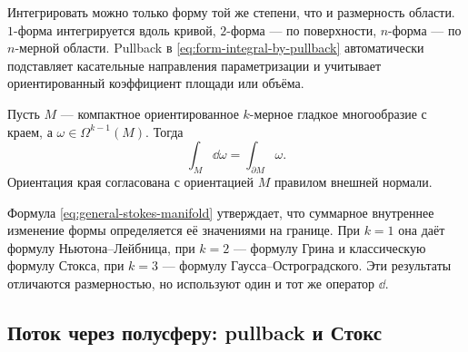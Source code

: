 Интегрировать можно только форму той же степени, что и размерность области. \(1\)-форма интегрируется вдоль кривой, \(2\)-форма --- по поверхности, \(n\)-форма --- по \(n\)-мерной области. Pullback в \eqref{eq:form-integral-by-pullback} автоматически подставляет касательные направления параметризации и учитывает ориентированный коэффициент площади или объёма.

\begin{theorem}
\label{thm:general-stokes-manifold}
Пусть \(M\) --- компактное ориентированное \(k\)-мерное гладкое многообразие с краем, а \(\omega\in\Omega^{k-1}(M)\). Тогда
\begin{equation}
\label{eq:general-stokes-manifold}
\boxed{
\int_M\dd\omega
=
\int_{\partial M}\omega
}.
\end{equation}
Ориентация края согласована с ориентацией \(M\) правилом внешней нормали.
\end{theorem}

Формула \eqref{eq:general-stokes-manifold} утверждает, что суммарное внутреннее изменение формы определяется её значениями на границе. При \(k=1\) она даёт формулу Ньютона--Лейбница, при \(k=2\) --- формулу Грина и классическую формулу Стокса, при \(k=3\) --- формулу Гаусса--Остроградского. Эти результаты отличаются размерностью, но используют один и тот же оператор \(\dd\).

\subsection{Поток через полусферу: pullback и Стокс}

